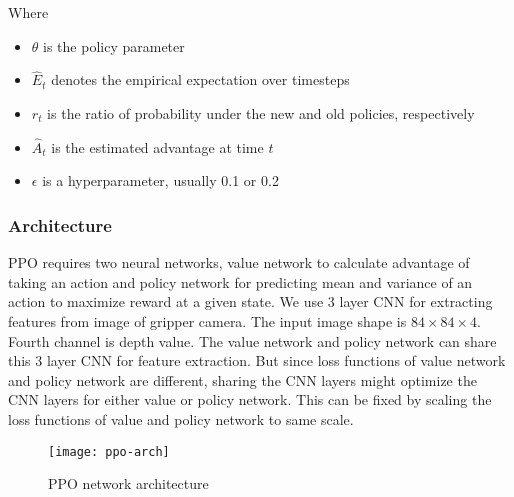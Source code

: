 Where
\begin{itemize}
	\item $\theta$ is the policy parameter
	\item $\hat{E}_t$ denotes the empirical expectation over timesteps
	\item $r_t$ is the ratio of probability under the new and old policies, respectively
	\item $\hat{A}_t$ is the estimated advantage at time $t$
	\item $\epsilon$ is a hyperparameter, usually 0.1 or 0.2
\end{itemize}

\subsubsection{Architecture}
PPO requires two neural networks, value network to calculate advantage of taking an action and policy network for predicting mean and variance of an action to maximize reward at a given state. We use 3 layer CNN for extracting features from image of gripper camera. The input image shape is $84 \times 84 \times 4$. Fourth channel is depth value. The value network and policy network can share this 3 layer CNN for feature extraction. But since loss functions of value network and policy network are different, sharing the CNN layers might optimize the CNN layers for either value or policy network. This can be fixed by scaling the loss functions of value and policy network to same scale.

\begin{figure}[H]
	\centering
	\texttt{[image: ppo-arch]}
	\caption{PPO network architecture}
\end{figure}